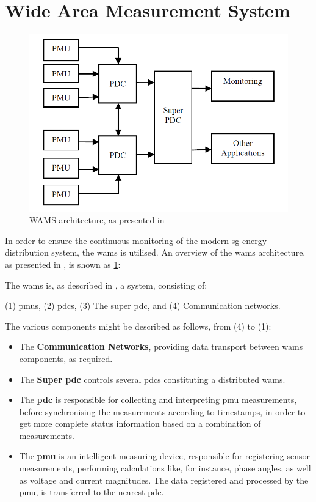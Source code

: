 \section{Wide Area Measurement System}
\begin{figure}[ht]
\includegraphics[width=\linewidth]{figures/Kumar-WAMS-architecture.png}
\caption[WAMS architecture]{WAMS architecture, as presented in \cite{kumar2015monitoring}}
\label{fig:Kumar-WAMS-architecture}
\end{figure}

   

In order to ensure the continuous monitoring of the modern \acrlong{sg} energy distribution system, the \acrfull{wams} is utilised. An overview of the \acrshort{wams} architecture, as presented in   \cite{kumar2015monitoring}, is shown as \figureautorefname  { } \ref{fig:Kumar-WAMS-architecture}:

The \acrshort{wams} is, as described in  \cite{kumar2015monitoring}, a  system, consisting of:

(1) \acrshort{pmu}s, (2) \acrshort{pdc}s, (3) The super \acrshort{pdc}, and (4) Communication networks.

The various components might be described as follows, from (4) to (1):
\begin{itemize}
    \item The \textbf{Communication Networks}, providing data transport between \acrshort{wams} components, as required.
    \item The \textbf{Super \acrshort{pdc}} controls several \acrshort{pdc}s constituting a distributed \acrshort{wams}.
\item The \textbf{\acrfull{pdc}} is responsible for collecting and interpreting \acrshort{pmu} measurements, before synchronising the measurements according to timestamps, in order to get more complete status information based on a combination of measurements.
    \item The \textbf{\acrfull{pmu}} is an intelligent measuring device, responsible for registering sensor measurements,  performing calculations like, for instance, phase angles, as well as voltage and current magnitudes. The data registered and processed by the \acrshort{pmu}, is transferred to the nearest \acrshort{pdc}.
    \end{itemize}





